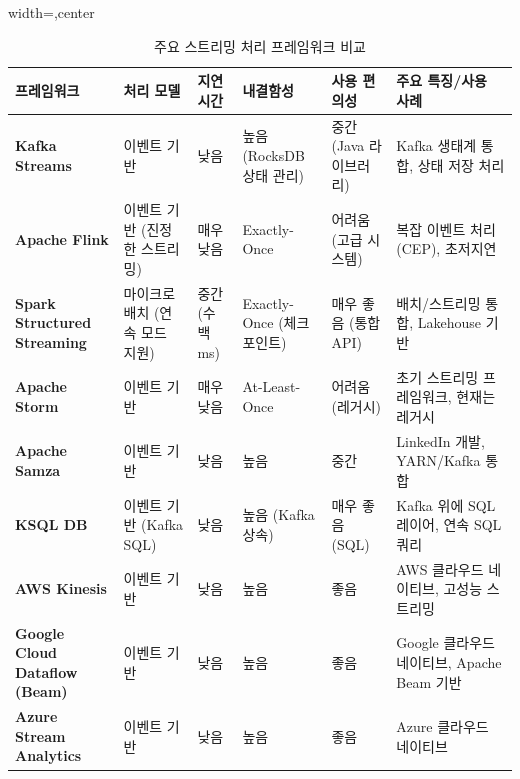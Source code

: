 \documentclass[11pt,a4paper]{article}
\theoremstyle{definition}
\begin{document}
\begin{table}[htbp]
\centering
\caption{주요 스트리밍 처리 프레임워크 비교}
\label{tab:streaming_frameworks}
\begin{adjustbox}{width=\textwidth,center}
\begin{tabular}{llllll}
\toprule
\textbf{프레임워크} & \textbf{처리 모델} & \textbf{지연 시간} & \textbf{내결함성} & \textbf{사용 편의성} & \textbf{주요 특징/사용 사례} \\
\midrule
\textbf{Kafka Streams} & 이벤트 기반 & 낮음 & 높음 (RocksDB 상태 관리) & 중간 (Java 라이브러리) & Kafka 생태계 통합, 상태 저장 처리 \\
\textbf{Apache Flink} & 이벤트 기반 (진정한 스트리밍) & 매우 낮음 & Exactly-Once & 어려움 (고급 시스템) & 복잡 이벤트 처리 (CEP), 초저지연 \\
\textbf{Spark Structured Streaming} & 마이크로 배치 (연속 모드 지원) & 중간 (수백 ms) & Exactly-Once (체크포인트) & 매우 좋음 (통합 API) & 배치/스트리밍 통합, Lakehouse 기반 \\
\textbf{Apache Storm} & 이벤트 기반 & 매우 낮음 & At-Least-Once & 어려움 (레거시) & 초기 스트리밍 프레임워크, 현재는 레거시 \\
\textbf{Apache Samza} & 이벤트 기반 & 낮음 & 높음 & 중간 & LinkedIn 개발, YARN/Kafka 통합 \\
\textbf{KSQL DB} & 이벤트 기반 (Kafka SQL) & 낮음 & 높음 (Kafka 상속) & 매우 좋음 (SQL) & Kafka 위에 SQL 레이어, 연속 SQL 쿼리 \\
\textbf{AWS Kinesis} & 이벤트 기반 & 낮음 & 높음 & 좋음 & AWS 클라우드 네이티브, 고성능 스트리밍 \\
\textbf{Google Cloud Dataflow (Beam)} & 이벤트 기반 & 낮음 & 높음 & 좋음 & Google 클라우드 네이티브, Apache Beam 기반 \\
\textbf{Azure Stream Analytics} & 이벤트 기반 & 낮음 & 높음 & 좋음 & Azure 클라우드 네이티브 \\
\bottomrule
\end{tabular}
\end{adjustbox}
\end{table}
\end{document}
